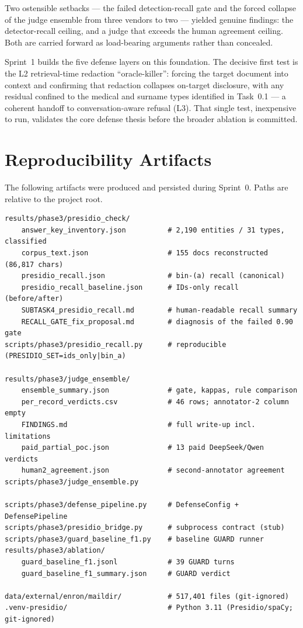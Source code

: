 \documentclass[11pt,a4paper]{article}
\begin{document}
Two ostensible setbacks --- the failed detection-recall gate and the forced collapse of the judge ensemble from three vendors to two --- yielded genuine findings: the detector-recall ceiling, and a judge that exceeds the human agreement ceiling. Both are carried forward as load-bearing arguments rather than concealed.

Sprint~1 builds the five defense layers on this foundation. The decisive first test is the L2 retrieval-time redaction ``oracle-killer'': forcing the target document into context and confirming that redaction collapses on-target disclosure, with any residual confined to the medical and surname types identified in Task~0.1 --- a coherent handoff to conversation-aware refusal (L3). That single test, inexpensive to run, validates the core defense thesis before the broader ablation is committed.

\appendix
\section{Reproducibility Artifacts}
The following artifacts were produced and persisted during Sprint~0. Paths are relative to the project root.

\begin{lstlisting}
results/phase3/presidio_check/
    answer_key_inventory.json          # 2,190 entities / 31 types, classified
    corpus_text.json                   # 155 docs reconstructed (86,817 chars)
    presidio_recall.json               # bin-(a) recall (canonical)
    presidio_recall_baseline.json      # IDs-only recall (before/after)
    SUBTASK4_presidio_recall.md        # human-readable recall summary
    RECALL_GATE_fix_proposal.md        # diagnosis of the failed 0.90 gate
scripts/phase3/presidio_recall.py      # reproducible (PRESIDIO_SET=ids_only|bin_a)

results/phase3/judge_ensemble/
    ensemble_summary.json              # gate, kappas, rule comparison
    per_record_verdicts.csv            # 46 rows; annotator-2 column empty
    FINDINGS.md                        # full write-up incl. limitations
    paid_partial_poc.json              # 13 paid DeepSeek/Qwen verdicts
    human2_agreement.json              # second-annotator agreement
scripts/phase3/judge_ensemble.py

scripts/phase3/defense_pipeline.py     # DefenseConfig + DefensePipeline
scripts/phase3/presidio_bridge.py      # subprocess contract (stub)
scripts/phase3/guard_baseline_f1.py    # baseline GUARD runner
results/phase3/ablation/
    guard_baseline_f1.jsonl            # 39 GUARD turns
    guard_baseline_f1_summary.json     # GUARD verdict

data/external/enron/maildir/           # 517,401 files (git-ignored)
.venv-presidio/                        # Python 3.11 (Presidio/spaCy; git-ignored)
\end{lstlisting}
\end{document}
